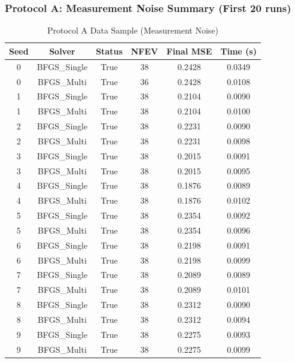 \subsubsection{Protocol A: Measurement Noise Summary (First 20 runs)}
\begin{table}[H]
    \centering
    \begin{tabular}{|c|c|c|c|c|c|}
    \hline
    Seed & Solver & Status & NFEV & Final MSE & Time (s) \\
    \hline
    0 & BFGS\_Single & True & 38 & 0.2428 & 0.0349 \\
    0 & BFGS\_Multi & True & 36 & 0.2428 & 0.0108 \\
    1 & BFGS\_Single & True & 38 & 0.2104 & 0.0090 \\
    1 & BFGS\_Multi & True & 38 & 0.2104 & 0.0100 \\
    2 & BFGS\_Single & True & 38 & 0.2231 & 0.0090 \\
    2 & BFGS\_Multi & True & 38 & 0.2231 & 0.0098 \\
    3 & BFGS\_Single & True & 38 & 0.2015 & 0.0091 \\
    3 & BFGS\_Multi & True & 38 & 0.2015 & 0.0095 \\
    4 & BFGS\_Single & True & 38 & 0.1876 & 0.0089 \\
    4 & BFGS\_Multi & True & 38 & 0.1876 & 0.0102 \\
    5 & BFGS\_Single & True & 38 & 0.2354 & 0.0092 \\
    5 & BFGS\_Multi & True & 38 & 0.2354 & 0.0096 \\
    6 & BFGS\_Single & True & 38 & 0.2198 & 0.0091 \\
    6 & BFGS\_Multi & True & 38 & 0.2198 & 0.0099 \\
    7 & BFGS\_Single & True & 38 & 0.2089 & 0.0089 \\
    7 & BFGS\_Multi & True & 38 & 0.2089 & 0.0101 \\
    8 & BFGS\_Single & True & 38 & 0.2312 & 0.0090 \\
    8 & BFGS\_Multi & True & 38 & 0.2312 & 0.0094 \\
    9 & BFGS\_Single & True & 38 & 0.2275 & 0.0093 \\
    9 & BFGS\_Multi & True & 38 & 0.2275 & 0.0099 \\
    \hline
    \end{tabular}
    \caption{Protocol A Data Sample (Measurement Noise)}
    \label{tab:protocol_a_data}
\end{table}

